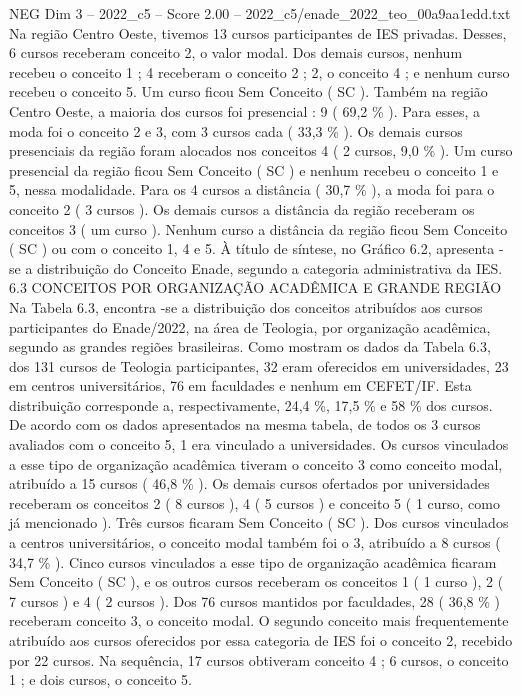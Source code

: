 \begin{textsample}{NEG Dim 3 – 2022\_c5 – Score 2.00 – 2022\_c5/enade\_2022\_teo\_00a9aa1edd.txt}
Na região Centro Oeste, tivemos 13 cursos participantes de IES privadas.
Desses, 6 cursos receberam conceito 2, o valor modal.
Dos demais cursos, nenhum recebeu o conceito 1 ; 4 receberam o conceito 2 ; 2, o conceito 4 ; e nenhum curso recebeu o conceito 5.
Um curso ficou Sem Conceito ( SC ).
Também na região Centro Oeste, a maioria dos cursos foi presencial : 9 ( 69,2 \% ).
Para esses, a moda foi o conceito 2 e 3, com 3 cursos cada ( 33,3 \% ).
Os demais cursos presenciais da região foram alocados nos conceitos 4 ( 2 cursos, 9,0 \% ).
Um curso presencial da região ficou Sem Conceito ( SC ) e nenhum recebeu o conceito 1 e 5, nessa modalidade.
Para os 4 cursos a distância ( 30,7 \% ), a moda foi para o conceito 2 ( 3 cursos ).
Os demais cursos a distância da região receberam os conceitos 3 ( um curso ).
Nenhum curso a distância da região ficou Sem Conceito ( SC ) ou com o conceito 1, 4 e 5.
À título de síntese, no Gráfico 6.2, apresenta -se a distribuição do Conceito Enade, segundo a categoria administrativa da IES. 6.3 CONCEITOS POR ORGANIZAÇÃO ACADÊMICA E GRANDE REGIÃO Na Tabela 6.3, encontra -se a distribuição dos conceitos atribuídos aos cursos participantes do Enade/2022, na área de Teologia, por organização acadêmica, segundo as grandes regiões brasileiras.
Como mostram os dados da Tabela 6.3, dos 131 cursos de Teologia participantes, 32 eram oferecidos em universidades, 23 em centros universitários, 76 em faculdades e nenhum em CEFET/IF.
Esta distribuição corresponde a, respectivamente, 24,4 \%, 17,5 \% e 58 \% dos cursos.
De acordo com os dados apresentados na mesma tabela, de todos os 3 cursos avaliados com o conceito 5, 1 era vinculado a universidades.
Os cursos vinculados a esse tipo de organização acadêmica tiveram o conceito 3 como conceito modal, atribuído a 15 cursos ( 46,8 \% ).
Os demais cursos ofertados por universidades receberam os conceitos 2 ( 8 cursos ), 4 ( 5 cursos ) e conceito 5 ( 1 curso, como já mencionado ).
Três cursos ficaram Sem Conceito ( SC ).
Dos cursos vinculados a centros universitários, o conceito modal também foi o 3, atribuído a 8 cursos ( 34,7 \% ).
Cinco cursos vinculados a esse tipo de organização acadêmica ficaram Sem Conceito ( SC ), e os outros cursos receberam os conceitos 1 ( 1 curso ), 2 ( 7 cursos ) e 4 ( 2 cursos ).
Dos 76 cursos mantidos por faculdades, 28 ( 36,8 \% ) receberam conceito 3, o conceito modal.
O segundo conceito mais frequentemente atribuído aos cursos oferecidos por essa categoria de IES foi o conceito 2, recebido por 22 cursos.
Na sequência, 17 cursos obtiveram conceito 4 ; 6 cursos, o conceito 1 ; e dois cursos, o conceito 5.

\end{textsample}
